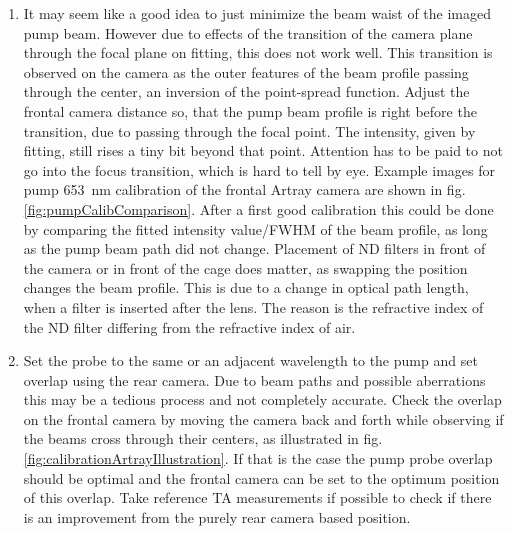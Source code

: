 \documentclass[twoside,openright,listof=numbered]{scrreprt}
\begin{document}
\begin{enumerate}
\item It may seem like a good idea to just minimize the beam waist of the imaged pump beam. However due to effects of the transition of the camera plane through the focal plane on fitting, this does not work well. This transition is observed on the camera as the outer features of the beam profile passing through the center, an inversion of the point-spread function. Adjust the frontal camera distance so, that the pump beam profile is right before the transition, due to passing through the focal point. The intensity, given by fitting, still rises a tiny bit beyond that point. Attention has to be paid to not go into the focus transition, which is hard to tell by eye. Example images for pump \qty{653}{\nano\meter} calibration of the frontal Artray camera are shown in fig. \ref{fig:pumpCalibComparison}. After a first good calibration this could be done by comparing the fitted intensity value/FWHM of the beam profile, as long as the pump beam path did not change. Placement of ND filters in front of the camera or in front of the cage does matter, as swapping the position changes the beam profile. This is due to a change in optical path length, when a filter is inserted after the lens. The reason is the refractive index of the ND filter differing from the refractive index of air.
\item Set the probe to the same or an adjacent wavelength to the pump and set overlap using the rear camera. Due to beam paths and possible aberrations this may be a tedious process and not completely accurate. Check the overlap on the frontal camera by moving the camera back and forth while observing if the beams cross through their centers, as illustrated in fig. \ref{fig:calibrationArtrayIllustration}. If that is the case the pump probe overlap should be optimal and the frontal camera can be set to the optimum position of this overlap. Take reference TA measurements if possible to check if there is an improvement from the purely rear camera based position.
\end{enumerate}
\end{document}
